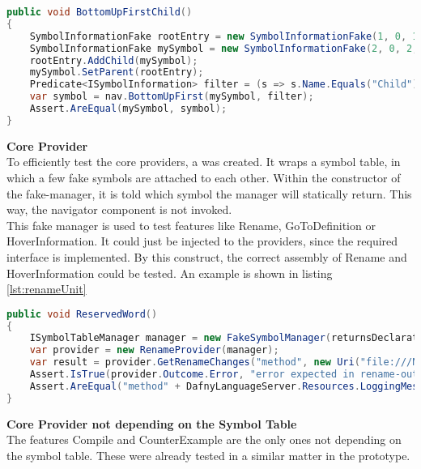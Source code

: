 \begin{lstlisting}[language=csharp, caption={Navigator Unit Test}, captionpos=b, label={lst:botuptest}]
public void BottomUpFirstChild()
{
    SymbolInformationFake rootEntry = new SymbolInformationFake(1, 0, 1, 0, 5, 0, defaultFile, "Parent");
    SymbolInformationFake mySymbol = new SymbolInformationFake(2, 0, 2, 0, 5, 0, defaultFile, "Child");
    rootEntry.AddChild(mySymbol);
    mySymbol.SetParent(rootEntry);
    Predicate<ISymbolInformation> filter = (s => s.Name.Equals("Child"));
    var symbol = nav.BottomUpFirst(mySymbol, filter);
    Assert.AreEqual(mySymbol, symbol);
}
\end{lstlisting}

\textbf{Core Provider}\\
To efficiently test the core providers, a  was created.
It wraps a symbol table, in which a few fake symbols are attached to each other.
Within the constructor of the fake-manager, it is told which symbol the manager will statically return.
This way, the navigator component is not invoked.\\

This fake manager is used to test features like Rename, GoToDefinition or HoverInformation.
It could just be injected to the providers, since the required interface  is implemented.
By this construct, the correct assembly of Rename and HoverInformation could be tested.
An example is shown in listing \ref{lst:renameUnit}

\begin{lstlisting}[language=csharp, caption={Core Provider Unit Test}, captionpos=b, label={lst:renameUnit}]
public void ReservedWord()
{
    ISymbolTableManager manager = new FakeSymbolManager(returnsDeclaration: false, returnsNull: false);
    var provider = new RenameProvider(manager);
    var result = provider.GetRenameChanges("method", new Uri("file:///N:/u/l.l"), 2, 22);
    Assert.IsTrue(provider.Outcome.Error, "error expected in rename-outcome");
    Assert.AreEqual("method" + DafnyLanguageServer.Resources.LoggingMessages.rename_reserved_word, provider.Outcome.Msg);
}
\end{lstlisting}

\textbf{Core Provider not depending on the Symbol Table}\\
The features Compile and CounterExample are the only ones not depending on the symbol table.
These were already tested in a similar matter in the prototype.\\

